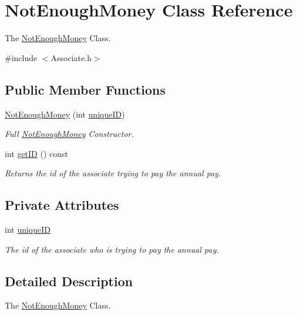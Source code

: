\hypertarget{classNotEnoughMoney}{}\section{Not\+Enough\+Money Class Reference}
\label{classNotEnoughMoney}


The \mbox{\hyperlink{classNotEnoughMoney}{Not\+Enough\+Money}} Class.  




{\ttfamily \#include $<$Associate.\+h$>$}

\subsection*{Public Member Functions}
\begin{DoxyCompactItemize}
\item 
\mbox{\hyperlink{classNotEnoughMoney_a8d626cbca191437e4c16f3d058a7d204}{Not\+Enough\+Money}} (int \mbox{\hyperlink{classNotEnoughMoney_a448ce0cf6fa4322dca36d379c3b94028}{unique\+ID}})
\begin{DoxyCompactList}\small\item\em Full \mbox{\hyperlink{classNotEnoughMoney}{Not\+Enough\+Money}} Constructor. \end{DoxyCompactList}\item 
int \mbox{\hyperlink{classNotEnoughMoney_a7f6054f81a4a84f1e9f2cb3f24fc498b}{get\+ID}} () const
\begin{DoxyCompactList}\small\item\em Returns the id of the associate trying to pay the annual pay. \end{DoxyCompactList}\end{DoxyCompactItemize}
\subsection*{Private Attributes}
\begin{DoxyCompactItemize}
\item 
int \mbox{\hyperlink{classNotEnoughMoney_a448ce0cf6fa4322dca36d379c3b94028}{unique\+ID}}
\begin{DoxyCompactList}\small\item\em The id of the associate who is trying to pay the annual pay. \end{DoxyCompactList}\end{DoxyCompactItemize}


\subsection{Detailed Description}
The \mbox{\hyperlink{classNotEnoughMoney}{Not\+Enough\+Money}} Class. 

